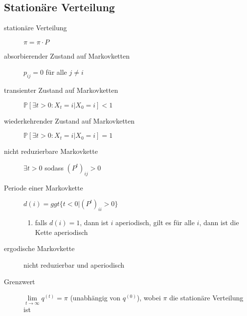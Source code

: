 \subsection{Stationäre Verteilung}
	\begin{description}
		\item[stationäre Verteilung] $\pi=\pi\cdot P$
		\item[absorbierender Zustand auf Markovketten] $p_{ij}=0$ für alle $j\neq i$
		\item[transienter Zustand auf Markovketten] $\mathbb{P}[\exists t>0 : X_t=i|X_0=i]<1$
		\item[wiederkehrender Zustand auf Markovketten] $\mathbb{P}[\exists t>0 : X_t=i|X_0=i]=1$
	\end{description}
\topbreak
\vspace*{-2\baselineskip}
	\begin{description}
		\item[nicht reduzierbare Markovkette] $\exists t>0$ sodass $(P^t)_{ij}>0$
		\item[Periode einer Markovkette] $d(i)=ggt\{t<0|(P^t)_{ii}>0\}$
			\begin{enumerate}
				\item falls $d(i)=1$, dann ist $i$ aperiodisch, gilt es für alle $i$, dann ist die Kette aperiodisch
			\end{enumerate}
		\item[ergodische Markovkette] nicht reduzierbar und aperiodisch
		\item[Grenzwert] $\lim\limits_{t\rightarrow\infty} q^{(t)}=\pi$ (unabhängig von $q^{(0)}$), wobei $\pi$ die stationäre Verteilung ist
	\end{description}